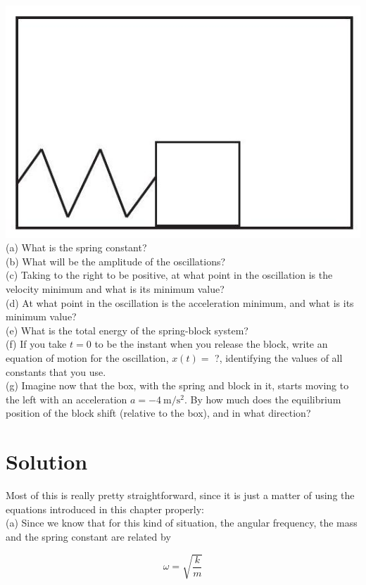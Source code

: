 \documentclass[10pt]{article}
\begin{document}
\includegraphics[max width=\textwidth, center]{2024_09_14_9969b06773f10b6936e8g-286}\\
(a) What is the spring constant?\\
(b) What will be the amplitude of the oscillations?\\
(c) Taking to the right to be positive, at what point in the oscillation is the velocity minimum and what is its minimum value?\\
(d) At what point in the oscillation is the acceleration minimum, and what is its minimum value?\\
(e) What is the total energy of the spring-block system?\\
(f) If you take $t=0$ to be the instant when you release the block, write an equation of motion for the oscillation, $x(t)=$ ?, identifying the values of all constants that you use.\\
(g) Imagine now that the box, with the spring and block in it, starts moving to the left with an acceleration $a=-4 \mathrm{~m} / \mathrm{s}^{2}$. By how much does the equilibrium position of the block shift (relative to the box), and in what direction?

\section*{Solution}
Most of this is really pretty straightforward, since it is just a matter of using the equations introduced in this chapter properly:\\
(a) Since we know that for this kind of situation, the angular frequency, the mass and the spring constant are related by

$$
\omega=\sqrt{\frac{k}{m}}
$$
\end{document}
